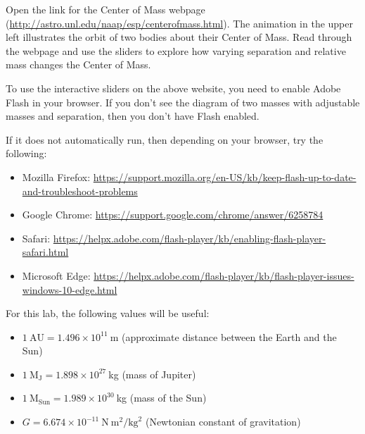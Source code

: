 Open the link for the Center of Mass webpage (\url{http://astro.unl.edu/naap/esp/centerofmass.html}). The animation in the upper left illustrates the orbit of two bodies about their Center of Mass. Read through the webpage and use the sliders to explore how varying separation and relative mass changes the Center of Mass.

\begin{framed}
	To use the interactive sliders on the above website, you need to enable Adobe Flash in your browser. If you don't see the diagram of two masses with adjustable masses and separation, then you don't have Flash enabled.
	
	If it does not automatically run, then depending on your browser, try the following:
	\begin{itemize}
		\item Mozilla Firefox: \url{https://support.mozilla.org/en-US/kb/keep-flash-up-to-date-and-troubleshoot-problems}
		
		\item Google Chrome: \url{https://support.google.com/chrome/answer/6258784}
		
		\item Safari: \url{https://helpx.adobe.com/flash-player/kb/enabling-flash-player-safari.html}
		
		\item Microsoft Edge: \url{https://helpx.adobe.com/flash-player/kb/flash-player-issues-windows-10-edge.html}
	\end{itemize}
\end{framed}

For this lab, the following values will be useful:
\begin{itemize}
	\item $1\:\textrm{AU} = 1.496 \times 10^{11}\:$m (approximate distance between the Earth and the Sun)
	
	\item $1\:\textrm{M}_\textrm{J} = 1.898 \times 10^{27}\:$kg (mass of Jupiter)
	
	\item $1\:\textrm{M}_\textrm{Sun} = 1.989 \times 10^{30}\:$kg (mass of the Sun)
	
	\item $G = 6.674 \times 10^{-11}\:\mathrm{N}\:\mathrm{m}^2/\mathrm{kg}^2$ (Newtonian constant of gravitation)
\end{itemize}

